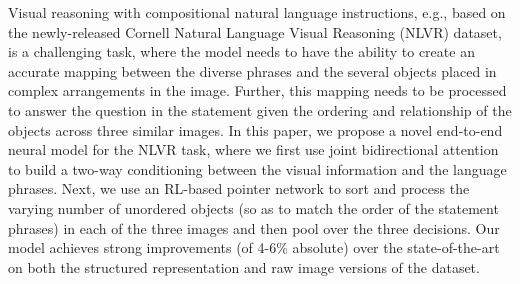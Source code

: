 Visual reasoning with compositional natural language instructions, e.g., based on the newly-released Cornell Natural Language Visual Reasoning (NLVR) dataset, is a challenging task, where the model needs to have the ability to create an accurate mapping between the diverse phrases and the several objects placed in complex arrangements in the image. Further, this mapping needs to be processed to answer the question in the statement given the ordering and relationship of the objects across three similar images. In this paper, we propose a novel end-to-end neural model for the NLVR task, where we first use joint bidirectional attention to build a two-way conditioning between the visual information and the language phrases. Next, we use an RL-based pointer network to sort and process the varying number of unordered objects (so as to match the order of the statement phrases) in each of the three images and then pool over the three decisions. Our model achieves strong improvements (of 4-6\% absolute) over the state-of-the-art on both the structured representation and raw image versions of the dataset.
